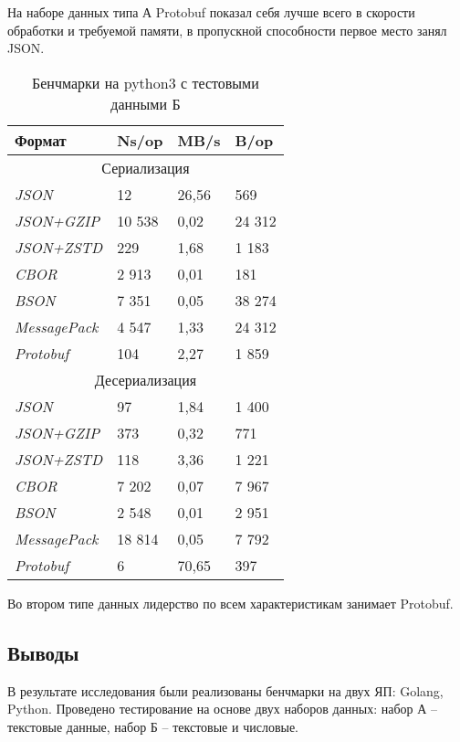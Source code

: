 На наборе данных типа А Protobuf показал себя лучше всего в скорости обработки и требуемой памяти, в пропускной способности первое место занял JSON.  
\clearpage
\begin{table}[ht!]
\centering
\caption{Бенчмарки на python3 с тестовыми данными Б}
\begin{tabular}{|l|l|l|l|} 
\hline
\textbf{Формат}      & \textbf{Ns/op} & \textbf{MB/s} & \textbf{B/op}  \\ 
\hline
\multicolumn{4}{|c|}{Сериализация}                                        \\ 
\hline
\textit{JSON}        &  12     &    26,56         &  569   \\ 
\hline
\textit{JSON+GZIP}   &  10 538      &  0,02            & 24 312    \\ 
\hline
\textit{JSON+ZSTD}   &  229      &   1,68          &  1 183  \\ 
\hline
\textit{CBOR}        & 2 913    &   0,01    & 181  \\ 
\hline
\textit{BSON}        & 7 351   &   0,05         & 38 274      \\ 
\hline
\textit{MessagePack} & 4 547     &    1,33       & 24 312  \\ 
\hline
\textit{Protobuf}    & 104     &   2,27         & 1 859  \\ 
\hline
\multicolumn{4}{|c|}{Десериализация}                                      \\ 
\hline
\textit{JSON}        &  97     &  1,84     &  1 400  \\ 
\hline
\textit{JSON+GZIP}   & 373  &   0,32       &  771  \\ 
\hline
\textit{JSON+ZSTD}   & 118  &    3,36        &  1 221  \\ 
\hline
\textit{CBOR}        & 7 202    &    0,07         & 7 967  \\ 
\hline
\textit{BSON}        & 2 548     &    0,01       &  2 951  \\ 
\hline
\textit{MessagePack} & 18 814    &    0,05         & 7 792   \\ 
\hline
\textit{Protobuf}    &    6      &     70,65        & 397   \\
\hline
\end{tabular}
\end{table}

Во втором типе данных лидерство по всем характеристикам занимает Protobuf.  
 
\subsection{Выводы}
В результате исследования были реализованы бенчмарки на двух ЯП: Golang, Python.  
Проведено тестирование на основе двух наборов данных: набор А -- текстовые данные, набор Б -- текстовые и числовые.  


